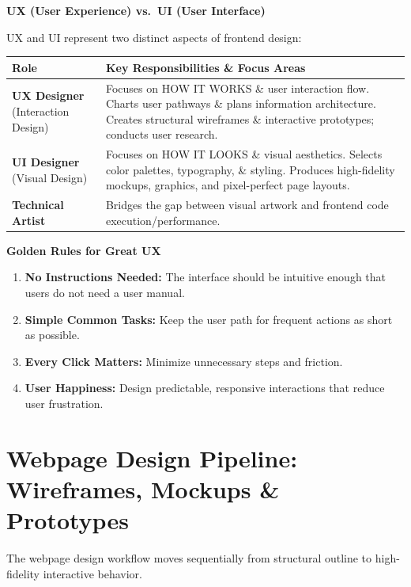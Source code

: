\documentclass[8pt, a4paper]{article}
\begin{document}
\begin{conceptbox}
\textbf{UX (User Experience) vs.\ UI (User Interface)}

UX and UI represent two distinct aspects of frontend design:

\smallskip
\begin{tabularx}{\linewidth}{l X}
  \toprule
  \textbf{Role} & \textbf{Key Responsibilities \& Focus Areas} \\
  \midrule
  \textbf{UX Designer} (Interaction Design)
    & Focuses on HOW IT WORKS \& user interaction flow. Charts user pathways \& plans information architecture.
      Creates structural wireframes \& interactive prototypes; conducts user research. \\[4pt]
  \textbf{UI Designer} (Visual Design)
    & Focuses on HOW IT LOOKS \& visual aesthetics. Selects color palettes, typography, \& styling.
      Produces high-fidelity mockups, graphics, and pixel-perfect page layouts. \\[4pt]
  \textbf{Technical Artist}
    & Bridges the gap between visual artwork and frontend code execution/performance. \\
  \bottomrule
\end{tabularx}
\end{conceptbox}

\begin{conceptbox}
\textbf{Golden Rules for Great UX}
\begin{enumerate}
  \item \textbf{No Instructions Needed:} The interface should be intuitive enough that users do not need a user manual.
  \item \textbf{Simple Common Tasks:} Keep the user path for frequent actions as short as possible.
  \item \textbf{Every Click Matters:} Minimize unnecessary steps and friction.
  \item \textbf{User Happiness:} Design predictable, responsive interactions that reduce user frustration.
\end{enumerate}
\end{conceptbox}

\section{Webpage Design Pipeline: Wireframes, Mockups \& Prototypes}

The webpage design workflow moves sequentially from structural outline to high-fidelity interactive behavior.
\end{document}
